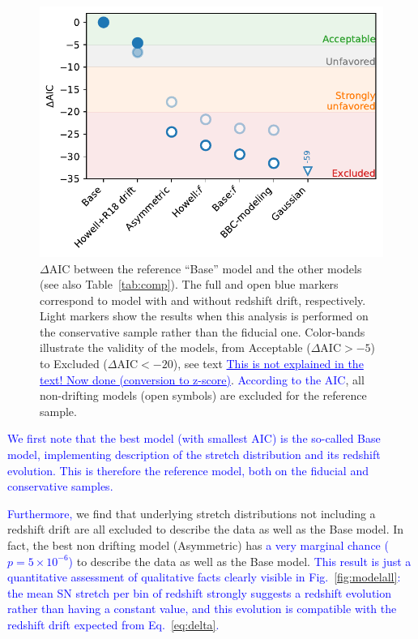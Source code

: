 \documentclass[]{aa} %
\newcommand{\mr}[1]{{\textcolor[rgb]{0.60,0.10,0.6}{#1}}}
\newcommand{\nn}[1]{{\textcolor[rgb]{1, 0.27, 0}{#1}}}
\newcommand{\yc}[1]{{\textcolor{blue}{#1}}}
\begin{document}
\begin{figure}
    \centering
    \includegraphics[width=\linewidth]{Article_figures/mod_comp.pdf}
    \caption{$\Delta$AIC between the reference ``Base'' model and the other
    models (see also Table~\ref{tab:comp}). The full and open blue markers
correspond to model with and without redshift drift, respectively. Light markers
show the results when this analysis is performed on the conservative sample 
rather than the fiducial one. Color-bands illustrate the validity of the models, from 
Acceptable ($\Delta\mathrm{AIC} > -5$) to Excluded ($\Delta\mathrm{AIC} < -20$),
see text \yc{\uline{This is not explained in the text! \nn{Now done (conversion to z-score)}}}. \yc{According to the AIC}, all non-drifting models (open symbols) are excluded for the reference sample.}
    \label{fig:mod_comp}
\end{figure}

\yc{We first note that the best model (with smallest AIC) is the so-called Base model, 
implementing \cite{rigault2018} description of the stretch distribution and its 
redshift evolution. This is therefore the reference model, both on the fiducial and 
conservative samples.}

\mr{\yc{Furthermore,} we find that underlying stretch distributions not including 
    a redshift drift are all
    excluded to describe the data as well as the Base model. In fact,
    the best non drifting model (Asymmetric) has \yc{a very marginal chance 
    ($p = 5\times10^{-6}$)} to
    describe the data as well as the Base model.}
    \yc{This result is just a quantitative assessment of qualitative facts clearly visible in 
    Fig.~\ref{fig:modelall}: the mean SN stretch per bin of redshift strongly 
    suggests a redshift evolution rather than having a constant value, and this evolution is compatible with the redshift drift expected from Eq.~\ref{eq:delta}.}
\end{document}
